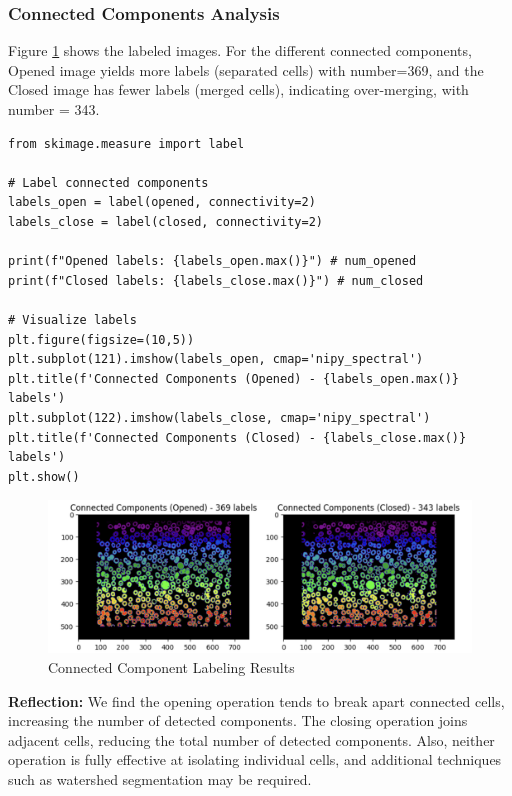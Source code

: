 \documentclass[12pt]{article}
\begin{document}
\subsubsection{Connected Components Analysis} %

Figure \ref{fig:connected_components} shows the labeled images. For the different connected components, Opened image yields more labels (separated cells) with number=369, and the Closed image has fewer labels (merged cells), indicating over-merging, with number = 343.


\begin{lstlisting}
from skimage.measure import label

# Label connected components
labels_open = label(opened, connectivity=2)
labels_close = label(closed, connectivity=2)

print(f"Opened labels: {labels_open.max()}") # num_opened
print(f"Closed labels: {labels_close.max()}") # num_closed

# Visualize labels
plt.figure(figsize=(10,5))
plt.subplot(121).imshow(labels_open, cmap='nipy_spectral')
plt.title(f'Connected Components (Opened) - {labels_open.max()} labels')
plt.subplot(122).imshow(labels_close, cmap='nipy_spectral')
plt.title(f'Connected Components (Closed) - {labels_close.max()} labels')
plt.show()
\end{lstlisting}


\begin{figure}[ht]
    \centering
        \includegraphics[width=\textwidth]{pics/a7-4.1.3}
    \caption{Connected Component Labeling Results}
    \label{fig:connected_components}
\end{figure}

\textbf{Reflection: }We find the opening operation tends to break apart connected cells, increasing the number of detected components. The closing operation joins adjacent cells, reducing the total number of detected components. Also, neither operation is fully effective at isolating individual cells, and additional techniques such as watershed segmentation may be required.
\end{document}
